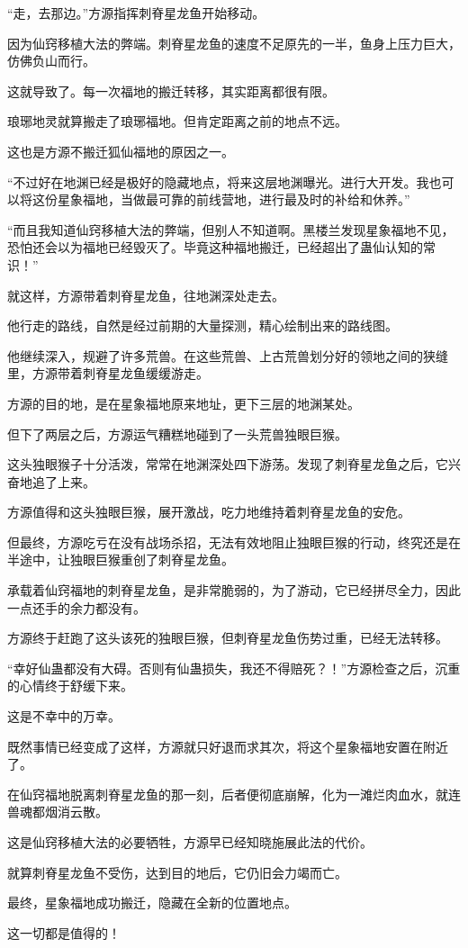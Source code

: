 \begin{this_body}
“走，去那边。”方源指挥刺脊星龙鱼开始移动。

因为仙窍移植大法的弊端。刺脊星龙鱼的速度不足原先的一半，鱼身上压力巨大，仿佛负山而行。

这就导致了。每一次福地的搬迁转移，其实距离都很有限。

琅琊地灵就算搬走了琅琊福地。但肯定距离之前的地点不远。

这也是方源不搬迁狐仙福地的原因之一。

“不过好在地渊已经是极好的隐藏地点，将来这层地渊曝光。进行大开发。我也可以将这份星象福地，当做最可靠的前线营地，进行最及时的补给和休养。”

“而且我知道仙窍移植大法的弊端，但别人不知道啊。黑楼兰发现星象福地不见，恐怕还会以为福地已经毁灭了。毕竟这种福地搬迁，已经超出了蛊仙认知的常识！”

就这样，方源带着刺脊星龙鱼，往地渊深处走去。

他行走的路线，自然是经过前期的大量探测，精心绘制出来的路线图。

他继续深入，规避了许多荒兽。在这些荒兽、上古荒兽划分好的领地之间的狭缝里，方源带着刺脊星龙鱼缓缓游走。

方源的目的地，是在星象福地原来地址，更下三层的地渊某处。

但下了两层之后，方源运气糟糕地碰到了一头荒兽独眼巨猴。

这头独眼猴子十分活泼，常常在地渊深处四下游荡。发现了刺脊星龙鱼之后，它兴奋地追了上来。

方源值得和这头独眼巨猴，展开激战，吃力地维持着刺脊星龙鱼的安危。

但最终，方源吃亏在没有战场杀招，无法有效地阻止独眼巨猴的行动，终究还是在半途中，让独眼巨猴重创了刺脊星龙鱼。

承载着仙窍福地的刺脊星龙鱼，是非常脆弱的，为了游动，它已经拼尽全力，因此一点还手的余力都没有。

方源终于赶跑了这头该死的独眼巨猴，但刺脊星龙鱼伤势过重，已经无法转移。

“幸好仙蛊都没有大碍。否则有仙蛊损失，我还不得赔死？！”方源检查之后，沉重的心情终于舒缓下来。

这是不幸中的万幸。

既然事情已经变成了这样，方源就只好退而求其次，将这个星象福地安置在附近了。

在仙窍福地脱离刺脊星龙鱼的那一刻，后者便彻底崩解，化为一滩烂肉血水，就连兽魂都烟消云散。

这是仙窍移植大法的必要牺牲，方源早已经知晓施展此法的代价。

就算刺脊星龙鱼不受伤，达到目的地后，它仍旧会力竭而亡。

最终，星象福地成功搬迁，隐藏在全新的位置地点。

这一切都是值得的！

\end{this_body}

